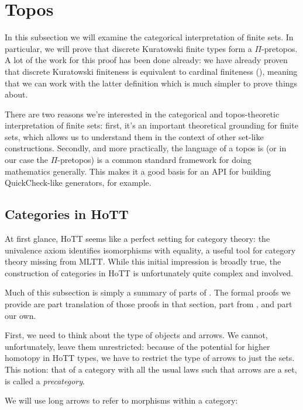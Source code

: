 \section{Topos} \label{topos}
In this subsection we will examine the categorical interpretation of finite sets.
In particular, we will prove that discrete Kuratowski finite types form a
\(\Pi\)-pretopos.
A lot of the work for this proof has been done already: we have already proven
that discrete Kuratowski finiteness is equivalent to cardinal finiteness
(), meaning that we can work with the latter
definition which is much simpler to prove things about.

There are two reasons we're interested in the categorical and topos-theoretic
interpretation of finite sets: first, it's an important theoretical grounding
for finite sets, which allows us to understand them in the context of other
set-like constructions.
Secondly, and more practically, the language of a topos is (or in our case the
\(\Pi\)-pretopos) is a common standard framework for doing mathematics
generally.
This makes it a good basis for an API for building QuickCheck-like generators,
for example.
\subsection{Categories in HoTT}
At first glance, HoTT seems like a perfect setting for category theory: the
univalence axiom identifies isomorphisms with equality, a useful tool for
category theory missing from MLTT.
While this initial impression is broadly true, the construction of categories in
HoTT is unfortunately quite complex and involved.

Much of this subsection is simply a summary of parts of \citet[section
9]{hottbook}.
The formal proofs we provide are part translation of those proofs in that
section, part from \citep{iversenFredefoxCat2018}
\citep{huProofrelevantCategoryTheory2020}, and part our own.

First, we need to think about the type of objects and arrows.
We cannot, unfortunately, leave them unrestricted: because of the potential for
higher homotopy in HoTT types, we have
to restrict the type of arrows to just the sets.
This notion: that of a category with all the usual laws such that arrows are a
set, is called a \emph{precategory}.
\begin{agdalisting}
\end{agdalisting}
We will use long arrows to refer to morphisms within a category:
\begin{agdalisting*}
\end{agdalisting*}

